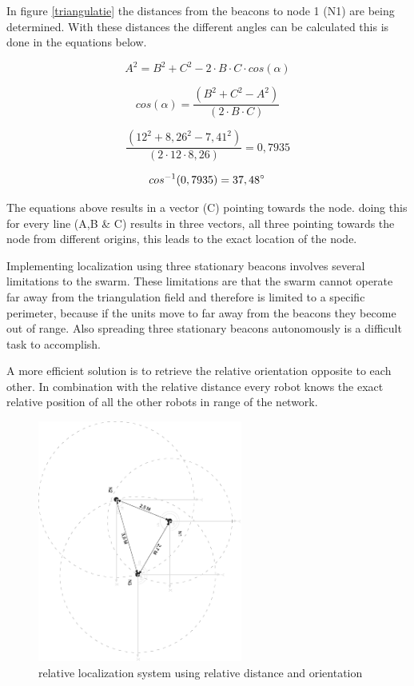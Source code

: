 \documentclass[10pt,a4paper]{article}
\begin{document}
In figure \ref{triangulatie} the distances from the beacons to node 1 (N1) are being determined. With these distances the different angles can be calculated this is done in the equations below.

\begin{equation}
A^2 = B^2 + C^2 - 2\cdot B\cdot C\cdot cos(\alpha)
\end{equation}

\begin{equation}
\label{eq:hoek}
cos(\alpha) = \frac{(B^2 + C^2 - A^2)}{(2\cdot B\cdot C)}
\end{equation}

\begin{equation}
\label{eq:hoek}
\frac{(12^2 + 8,26^2 - 7,41^2)}{(2\cdot12\cdot8,26)} = 0,7935
\end{equation}

\begin{equation}
cos^{-1}(0,7935) = 37,48\degree
\end{equation}

The equations above results in a vector (C) pointing towards the node. doing this for every line (A,B \& C) results in three vectors, all three pointing towards the node from different origins, this leads to the exact location of the node. 

Implementing localization using three stationary beacons involves several limitations to the swarm. These limitations are that the swarm cannot operate far away from the triangulation field and therefore is limited to a specific perimeter, because if the units move to far away from the beacons they become out of range. Also spreading three stationary beacons autonomously is a difficult task to accomplish.  

A more efficient solution is to retrieve the relative orientation opposite to each other. In combination with the relative distance every robot knows the exact relative position of all the other robots in range of the network.

\begin{figure}[H]
\centering
\includegraphics[angle=90, width=0.6\textwidth]{orientation.pdf}
\caption{relative localization system using relative distance and orientation}
\label{orientation}
\end{figure}
\end{document}
